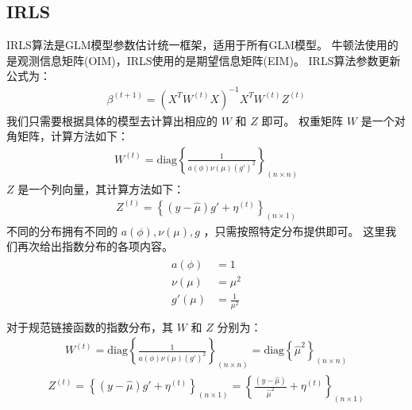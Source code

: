 \documentclass[letterpaper,10pt,english]{sphinxmanual}
\begin{document}
\subsection{IRLS}
\label{\detokenize{_u6307_u6570_u6a21_u578b/content:irls}}
IRLS算法是GLM模型参数估计统一框架，适用于所有GLM模型。
牛顿法使用的是观测信息矩阵(OIM)，IRLS使用的是期望信息矩阵(EIM)。
IRLS算法参数更新公式为：
\begin{equation}\label{equation:指数模型/content:指数模型/content:19}
\begin{split}\beta^{(t+1)} = (X^T W^{(t)} X)^{-1} X^T W^{(t)} Z^{(t)}\end{split}
\end{equation}
我们只需要根据具体的模型去计算出相应的 \(W\) 和 \(Z\) 即可。
权重矩阵 \(W\) 是一个对角矩阵，计算方法如下：
\begin{equation}\label{equation:指数模型/content:eq_gaussian_0030}
\begin{split} W^{(t)}
= \text{diag} \left \{ \frac{ 1}{ a(\phi) \nu(\mu) ( g' )^2}
 \right \}_{(n\times n)}\end{split}
\end{equation}
\(Z\) 是一个列向量，其计算方法如下：
\begin{equation}\label{equation:指数模型/content:指数模型/content:20}
\begin{split}Z^{(t)}=  \left \{ (y- \hat{\mu}) g'  + \eta^{(t)}
\right \}_{(n\times 1 )}\end{split}
\end{equation}
不同的分布拥有不同的 \(a(\phi),\nu(\mu),g\)
，只需按照特定分布提供即可。
这里我们再次给出指数分布的各项内容。
\begin{align}\label{equation:指数模型/content:指数模型/content:21}\!\begin{aligned}
a(\phi) &= 1\\
\nu(\mu) &= \mu^2\\
g'(\mu) &= \frac{1}{\mu^2}\\
\end{aligned}\end{align}
对于规范链接函数的指数分布，其 \(W\) 和 \(Z\) 分别为：
\begin{equation}\label{equation:指数模型/content:指数模型/content:22}
\begin{split}W^{(t)}
= \text{diag} \left \{ \frac{ 1}{ a(\phi) \nu(\mu) ( g' )^2}
\right \}_{(n\times n)}
=\text{diag} \left \{  \hat{\mu}^2 \right \}_{(n\times n)}\end{split}
\end{equation}\begin{equation}\label{equation:指数模型/content:指数模型/content:23}
\begin{split}Z^{(t)} =  \left \{ (y- \hat{\mu}) g'  + \eta^{(t)}
\right \}_{(n\times 1 )}
= \left \{  \frac{(y- \hat{\mu})}{\hat{\mu}^2}     + \eta^{(t)}    \right \}_{(n\times 1 )}\end{split}
\end{equation}
\end{document}
